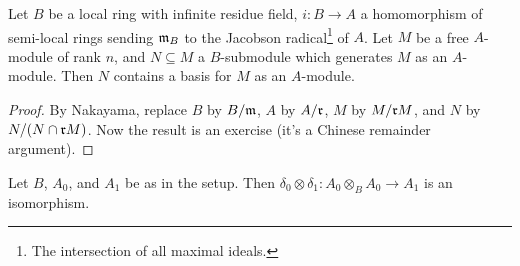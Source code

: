  \begin{lemma}\label{lec13L:N_contains_a_basis}
   Let $B$ be a local ring with infinite residue field, $i:B\to A$ a homomorphism of
   semi-local rings sending $\mathfrak{m}_B$ to the Jacobson radical\footnote{The intersection of
   all maximal ideals.} of $A$. Let $M$ be a free $A$-module of rank $n$, and
   $N\subseteq M$ a $B$-submodule which generates $M$ as an $A$-module. Then $N$
   contains a basis for $M$ as an $A$-module.
 \end{lemma}
 \begin{proof}
   By Nakayama, replace $B$ by $B/\mathfrak{m}$, $A$ by $A/\mathfrak{r}$, $M$ by $M/\mathfrak{r} M$, and $N$ by
   $N/(N\cap \mathfrak{r} M)$. Now the result is an exercise (it's a Chinese remainder argument).
 \end{proof}
 \begin{lemma}\label{lec13L:A0xA0_isomorphic_A1}
   Let $B$, $A_0$, and  $A_1$ be as in the setup. Then $\delta_0\otimes
   \delta_1:A_0\otimes_B A_0\to A_1$ is an isomorphism.
 \end{lemma}
